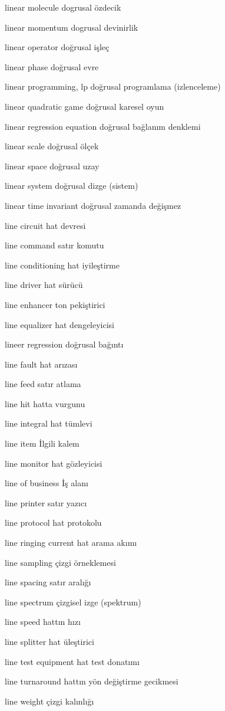 \documentclass[12pt,fleqn]{article}\usepackage{../../common}
\begin{document}
linear molecule dogrusal özdecik

linear momentum dogrusal devinirlik

linear operator doğrusal işleç

linear phase doğrusal evre

linear programming, lp doğrusal programlama (izlenceleme)

linear quadratic game doğrusal karesel oyun

linear regression equation doğrusal bağlanım denklemi

linear scale doğrusal ölçek

linear space doğrusal uzay

linear system doğrusal dizge (sistem)

linear time invariant doğrusal zamanda değişmez

line circuit hat devresi

line command satır komutu

line conditioning hat iyileştirme

line driver hat sürücü

line enhancer ton pekiştirici

line equalizer hat dengeleyicisi

lineer regression doğrusal bağıntı

line fault hat arızası

line feed satır atlama

line hit hatta vurgunu

line integral hat tümlevi

line item İlgili kalem

line monitor hat gözleyicisi

line of business İş alanı

line printer satır yazıcı

line protocol hat protokolu

line ringing current hat arama akımı

line sampling çizgi örneklemesi

line spacing satır aralığı

line spectrum çizgisel izge (spektrum)

line speed hattın hızı

line splitter hat üleştirici

line test equipment hat test donatımı

line turnaround hattın yön değiştirme gecikmesi

line weight çizgi kalınlığı
\end{document}

